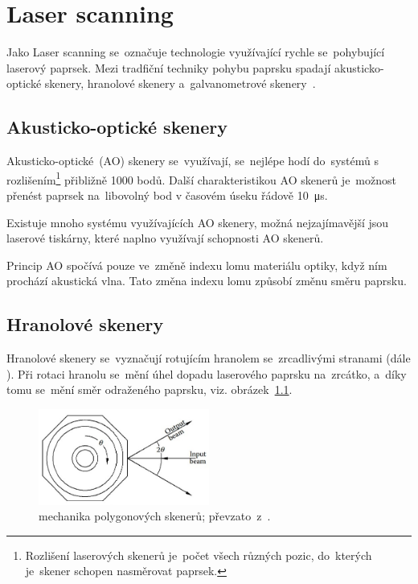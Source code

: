 \chapter{Laser scanning~\cite{scanning-handbook}}

Jako Laser scanning se~označuje technologie využívající rychle se~pohybující laserový paprsek. Mezi tradfiční techniky pohybu paprsku spadají akusticko-optické skenery, hranolové skenery a~galvanometrové skenery~\cite{mems-review}.

\section{Akusticko-optické skenery}
Akusticko-optické~(AO) skenery se~využívají, se~nejlépe hodí do~systémů s rozlišením\footnote{Rozlišení laserových skenerů je~počet všech různých pozic, do~kterých je~skener schopen nasměrovat paprsek.} přibližně 1000 bodů.
Další charakteristikou AO skenerů je~možnost přenést paprsek na~libovolný bod v časovém úseku řádově 10~\textgreek{μ}s.

Existuje mnoho systému využívajících AO skenery, možná nejzajímavější jsou laserové tiskárny, které naplno využívají schopnosti AO skenerů.

Princip AO spočívá pouze ve~změně indexu lomu materiálu optiky, když ním prochází akustická vlna. Tato změna indexu lomu způsobí změnu směru paprsku.

\section{Hranolové skenery}
Hranolové skenery se~vyznačují rotujícím hranolem se~zrcadlivými stranami (dále ).
Při rotaci hranolu se~mění úhel dopadu laserového paprsku na~zrcátko, a~díky tomu se~mění směr odraženého paprsku, viz. obrázek~\ref{fig:polygon-scanner}. 

\begin{figure}[H]
  \centering
  \includegraphics[width=0.5\textwidth]{img/polygon-scanner.jpg}
  \caption{\label{fig:polygon-scanner} mechanika polygonových skenerů; převzato~z~\cite{scanning-handbook}.}
\end{figure}

